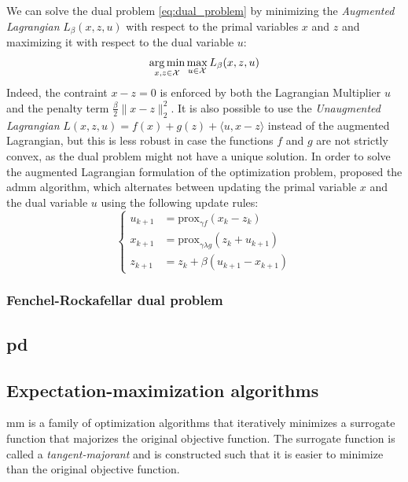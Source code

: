 We can solve the dual problem \eqref{eq:dual_problem} by minimizing the \textit{Augmented Lagrangian} $L_{\beta}(x, z, u)$ with respect to the primal variables $x$ and $z$ and maximizing it with respect to the dual variable $u$:
\begin{equation}
    \mathop{\mathrm{arg\,min}}_{x, z \in \mathcal{X}} \max_{u \in \mathcal{X}} L_{\beta}(x, z, u)
\end{equation}
Indeed, the contraint $x - z = 0$ is enforced by both the Lagrangian Multiplier $u$ and the penalty term $\frac{\beta}{2} \|x - z\|_2^2$.
It is also possible to use the \textit{Unaugmented Lagrangian} $L(x, z, u) = f(x) + g(z) + \langle u, x - z \rangle$ instead of the augmented Lagrangian, but this is less robust in case the functions $f$ and $g$ are not strictly convex, as the dual problem might not have a unique solution. %
In order to solve the augmented Lagrangian formulation of the optimization problem, \cite{boyd2011distributed} proposed the \acrfull{admm} algorithm, which alternates between updating the primal variable $x$ and the dual variable $u$ using the following update rules:
\begin{equation}
    \begin{cases}
        u_{k+1} &= \text{prox}_{\gamma f}(x_k - z_k) \\
        x_{k+1} &= \text{prox}_{\gamma \lambda g}(z_k + u_{k+1}) \\
        z_{k+1} &= z_k + \beta(u_{k+1} - x_{k+1})
    \end{cases}
\end{equation}

\subsubsection{Fenchel-Rockafellar dual problem}



\subsection{\texorpdfstring{\acrfull{pd}}{PD} }

\subsection{Expectation-maximization algorithms}

\acrfull{mm} is a family of optimization algorithms that iteratively minimizes a surrogate function that majorizes the original objective function.
The surrogate function is called a \textit{tangent-majorant} and is constructed such that it is easier to minimize than the original objective function.

